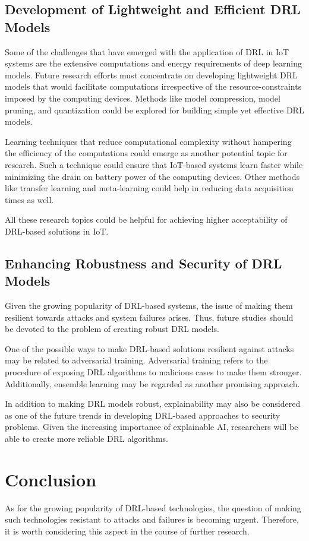 \documentclass[12pt]{article}
\begin{document}
\subsection{Development of Lightweight and Efficient DRL Models}
Some of the challenges that have emerged with the application of DRL in IoT systems are the extensive computations and energy requirements of deep learning models. Future research efforts must concentrate on developing lightweight DRL models that would facilitate computations irrespective of the resource-constraints imposed by the computing devices. Methods like model compression, model pruning, and quantization could be explored for building simple yet effective DRL models.

Learning techniques that reduce computational complexity without hampering the efficiency of the computations could emerge as another potential topic for research. Such a technique could ensure that IoT-based systems learn faster while minimizing the drain on battery power of the computing devices. Other methods like transfer learning and meta-learning could help in reducing data acquisition times as well.

All these research topics could be helpful for achieving higher acceptability of DRL-based solutions in IoT.
\subsection{Enhancing Robustness and Security of DRL Models}
Given the growing popularity of DRL-based systems, the issue of making them resilient towards attacks and system failures arises. Thus, future studies should be devoted to the problem of creating robust DRL models.

One of the possible ways to make DRL-based solutions resilient against attacks may be related to adversarial training. Adversarial training refers to the procedure of exposing DRL algorithms to malicious cases to make them stronger. Additionally, ensemble learning may be regarded as another promising approach.

In addition to making DRL models robust, explainability may also be considered as one of the future trends in developing DRL-based approaches to security problems. Given the increasing importance of explainable AI, researchers will be able to create more reliable DRL algorithms.
	\section{Conclusion}
	As for the growing popularity of DRL-based technologies, the question of making such technologies resistant to attacks and failures is becoming urgent. Therefore, it is worth considering this aspect in the course of further research.
\end{document}

